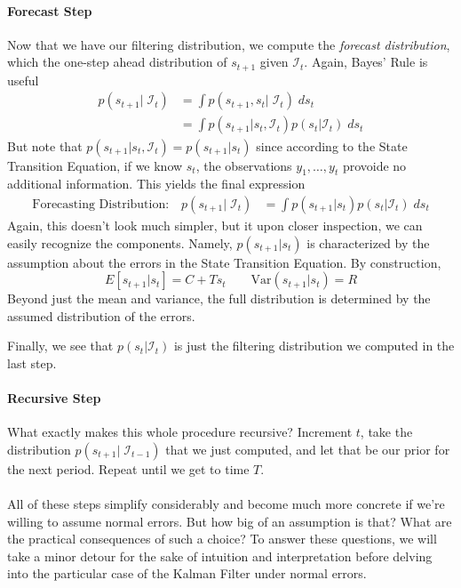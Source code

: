 \documentclass[a4paper,12pt]{article}
\begin{document}
\paragraph{Forecast Step} Now that we have our filtering distribution,
we compute the \emph{forecast distribution}, which the one-step ahead
distribution of $s_{t+1}$ given $\mathcal{I}_{t}$. Again, Bayes' Rule is
useful
\begin{align*}
  p(s_{t+1} | \; \mathcal{I}_{t}) &= 
    \int p(s_{t+1}, s_t |\; \mathcal{I}_{t}) \; ds_t \\
  &= \int p(s_{t+1} |  s_t, \mathcal{I}_{t}) 
    p(s_t |  \mathcal{I}_{t}) \; ds_t 
\end{align*}
But note that $p(s_{t+1} | s_t, \mathcal{I}_{t}) = p(s_{t+1}|s_t)$ since according to the State Transition Equation, if we know $s_{t}$, the observations $y_1, \ldots, y_t$ provoide no additional information. This yields the final expression
\begin{align}
  \text{Forecasting Distribution:} \quad
  p(s_{t+1} | \; \mathcal{I}_{t}) 
  &= \int p(s_{t+1} |  s_t) 
    p(s_t |  \mathcal{I}_{t}) \; ds_t 
\end{align}
Again, this doesn't look much simpler, but it upon closer inspection, we can easily recognize the components. Namely, $p(s_{t+1}|s_t)$ is characterized by the assumption about the errors in the State Transition Equation. By construction,
\[
  E[s_{t+1}|s_t] = C + Ts_t
  \qquad 
  \text{Var}(s_{t+1}|s_t) = R
\]
Beyond just the mean and variance, the full distribution is
determined by the assumed distribution of the errors.

Finally, we see that $p(s_t|\mathcal{I}_{t})$ is just the
filtering distribution we computed in the last step. 

\paragraph{Recursive Step} What exactly makes this whole procedure recursive? Increment $t$, take the distribution $p(s_{t+1}|\;\mathcal{I}_{t-1})$ that we just computed, and let that be our prior for the next period. Repeat until we get to time $T$.
\\
\\
All of these steps simplify considerably and become much more concrete if we're willing to assume normal errors. But how big of an assumption is that? What are the practical consequences of such a choice? To answer these questions, we will take a minor detour for the sake of intuition and interpretation before delving into the particular case of the Kalman Filter under normal errors.
\end{document}

